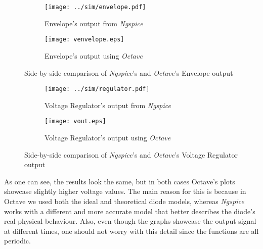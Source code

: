 \vspace{-2cm}
\begin{figure}[H]
\centering
\begin{subfigure}{.5\textwidth}
  \centering
  \texttt{[image: ../sim/envelope.pdf]}
  \caption{Envelope's output from \textit{Ngspice}}
  \label{fig:EnvelopeNGSPICE}
\end{subfigure}%
\begin{subfigure}{.5\textwidth}
  \centering
  \texttt{[image: venvelope.eps]}
  \caption{Envelope's output using \textit{Octave}}
  \label{fig:EnvelopeOCTAVE}
\end{subfigure}
\caption{Side-by-side comparison of \textit{Ngspice}'s and \textit{Octave}'s Envelope output}
\label{fig:EnvelopeComparacao}
\end{figure}
\vspace{-0.5cm}
\begin{figure}[H]
\centering
\begin{subfigure}{.5\textwidth}
  \centering
  \texttt{[image: ../sim/regulator.pdf]}
  \caption{Voltage Regulator's output from \textit{Ngspice}}
  \label{fig:RegulatorNGSPICE}
\end{subfigure}%
\begin{subfigure}{.5\textwidth}
  \centering
  \texttt{[image: vout.eps]}
  \caption{Voltage Regulator's output using \textit{Octave}}
  \label{fig:RegulatorOCTAVE}
\end{subfigure}
\caption{Side-by-side comparison of \textit{Ngspice}'s and \textit{Octave}'s Voltage Regulator output}
\label{fig:RegulatorComparacao}
\end{figure}

As one can see, the results look the same, but in both cases Octave's plots showcase slightly higher voltage values. The main reason for this is because in Octave we used both the ideal and theoretical diode models, whereas \textit{Ngspice} works with a different and
more accurate model that better describes the diode's real physical behaviour. Also, even though the graphs showcase the output signal at different times, one should not worry with this detail since the functions are all periodic.

